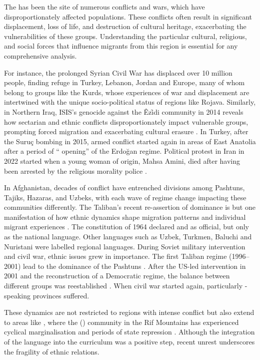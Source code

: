 \documentclass[output=paper,colorlinks,citecolor=brown]{langscibook}
\begin{document}
The  has been the site of numerous conflicts and wars, which have disproportionately affected  populations. These conflicts often result in significant displacement, loss of life, and destruction of cultural heritage, exacerbating the vulnerabilities of these groups. Understanding the particular cultural, religious, and social forces that influence migrants from this region is essential for any comprehensive analysis.

For instance, the prolonged Syrian Civil War has displaced over 10 million people, finding refuge in Turkey, Lebanon, Jordan and Europe, many of whom belong to  groups like the Kurds, whose experiences of war and displacement are intertwined with the unique socio-political status of regions like Rojava. Similarly, in Northern Iraq, ISIS's genocide against the Êzȋdi community in 2014 reveals how sectarian and ethnic conflicts disproportionately impact vulnerable groups, prompting forced migration and exacerbating cultural erasure \citep{schmidinger2019}. In Turkey, after the Suruç bombing in 2015, armed conflict started again in  areas of East Anatolia after a period of `` opening'' of the Erdoğan regime. Political protest in Iran in 2022 started when a young woman of  origin, Mahsa Amini, died after having been arrested by the religious morality police \citep{Kazemzadeh2023MassProtestsIran}. 

In Afghanistan, decades of conflict have entrenched divisions among Pashtuns, Tajiks, Hazaras, and Uzbeks, with each wave of regime change impacting these communities differently. The Taliban's recent re-assertion of  dominance is but one manifestation of how ethnic dynamics shape migration patterns and individual migrant experiences \citep{ahwar2023}. The constitution of 1964 declared  and  as official, but only  as the national language. Other languages such as Uzbek, Turkmen, Baluchi and Nuristani were labelled regional languages. During Soviet military intervention and civil war, ethnic issues grew in importance. The first Taliban regime (1996--2001) lead to the dominance of the Pashtuns \citep{nawid2012}. After the US-led intervention in 2001 and the reconstruction of a Democratic regime, the balance between different groups was reestablished \citep{schetter2005}. When civil war started again, particularly -speaking provinces suffered. 

These dynamics are not restricted to regions with intense conflict but also extend to areas like , where the  () community in the Rif Mountains has experienced cyclical marginalisation and periods of state repression \citep{kratochwil2002}. Although the integration of the  language into the curriculum was a positive step, recent unrest underscores the fragility of ethnic relations. 
\end{document}
